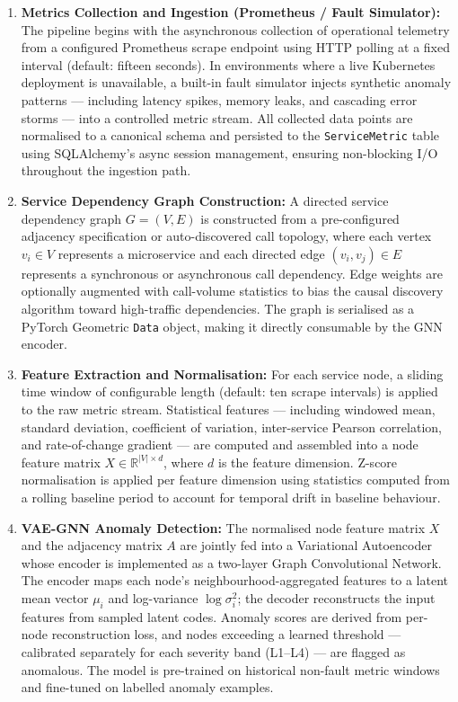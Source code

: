 \begin{enumerate}

    \item \textbf{Metrics Collection and Ingestion (Prometheus / Fault Simulator):}
    The pipeline begins with the asynchronous collection of operational telemetry from a configured Prometheus scrape endpoint using HTTP polling at a fixed interval (default: fifteen seconds). In environments where a live Kubernetes deployment is unavailable, a built-in fault simulator injects synthetic anomaly patterns — including latency spikes, memory leaks, and cascading error storms — into a controlled metric stream. All collected data points are normalised to a canonical schema and persisted to the \texttt{ServiceMetric} table using SQLAlchemy's async session management, ensuring non-blocking I/O throughout the ingestion path.\\

    \item \textbf{Service Dependency Graph Construction:}
    A directed service dependency graph $G = (V, E)$ is constructed from a pre-configured adjacency specification or auto-discovered call topology, where each vertex $v_i \in V$ represents a microservice and each directed edge $(v_i, v_j) \in E$ represents a synchronous or asynchronous call dependency. Edge weights are optionally augmented with call-volume statistics to bias the causal discovery algorithm toward high-traffic dependencies. The graph is serialised as a PyTorch Geometric \texttt{Data} object, making it directly consumable by the GNN encoder.\\

    \item \textbf{Feature Extraction and Normalisation:}
    For each service node, a sliding time window of configurable length (default: ten scrape intervals) is applied to the raw metric stream. Statistical features — including windowed mean, standard deviation, coefficient of variation, inter-service Pearson correlation, and rate-of-change gradient — are computed and assembled into a node feature matrix $X \in \mathbb{R}^{|V| \times d}$, where $d$ is the feature dimension. Z-score normalisation is applied per feature dimension using statistics computed from a rolling baseline period to account for temporal drift in baseline behaviour.\\

    \item \textbf{VAE-GNN Anomaly Detection:}
    The normalised node feature matrix $X$ and the adjacency matrix $A$ are jointly fed into a Variational Autoencoder whose encoder is implemented as a two-layer Graph Convolutional Network. The encoder maps each node's neighbourhood-aggregated features to a latent mean vector $\mu_i$ and log-variance $\log \sigma_i^2$; the decoder reconstructs the input features from sampled latent codes. Anomaly scores are derived from per-node reconstruction loss, and nodes exceeding a learned threshold — calibrated separately for each severity band (L1–L4) — are flagged as anomalous. The model is pre-trained on historical non-fault metric windows and fine-tuned on labelled anomaly examples.\\


\end{enumerate}
